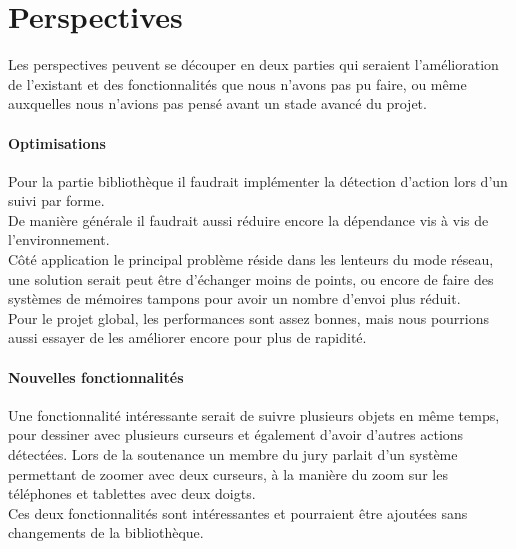 \documentclass{report}
\begin{document}
		\section{Perspectives \\}
		Les perspectives peuvent se découper en deux parties qui seraient l'amélioration de l'existant et des fonctionnalités que nous n'avons pas pu faire, ou même auxquelles nous n'avions pas pensé avant un stade avancé du projet. \\
		
		\paragraph{Optimisations \\}
		Pour la partie bibliothèque il faudrait implémenter la détection d'action lors d'un suivi par forme. \\
		De manière générale il faudrait aussi réduire encore la dépendance vis à vis de l'environnement. \\
		Côté application le principal problème réside dans les lenteurs du mode réseau, une solution serait peut être d'échanger moins de points, ou encore de faire des systèmes de mémoires tampons pour avoir un nombre d'envoi plus réduit. \\
		
		Pour le projet global, les performances sont assez bonnes, mais nous pourrions aussi essayer de les améliorer encore pour plus de rapidité. \\ 
		
		\paragraph{Nouvelles fonctionnalités \\}
		Une fonctionnalité intéressante serait de suivre plusieurs objets en même temps, pour dessiner avec plusieurs curseurs et également d'avoir d'autres actions détectées. Lors de la soutenance un membre du jury parlait d'un système permettant de zoomer avec deux curseurs, à la manière du zoom sur les téléphones et tablettes avec deux doigts. \\
Ces deux fonctionnalités sont intéressantes et pourraient être ajoutées sans changements de la bibliothèque. \\	
		
\end{document}
